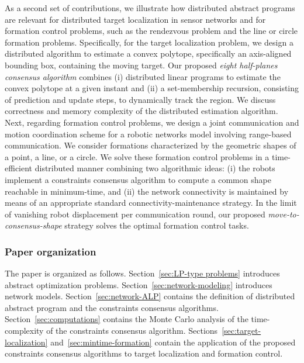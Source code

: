 \documentclass[onecolumn,journal,letterpaper]{IEEEtran}
\begin{document}
As a second set of contributions, we illustrate how distributed abstract
programs are relevant for distributed target localization in sensor
networks and for formation control problems, such as the rendezvous problem
and the line or circle formation problems. Specifically, for the target
localization problem, we design a distributed algorithm to estimate a
convex polytope, specifically an axis-aligned bounding box, containing the
moving target.  Our proposed \emph{eight half-planes consensus algorithm}
combines (i) distributed linear programs to estimate the convex polytope at
a given instant and (ii) a set-membership recursion, consisting of
prediction and update steps, to dynamically track the region. We discuss
correctness and memory complexity of the distributed estimation algorithm.
Next, regarding formation control problems, we design a joint communication
and motion coordination scheme for a robotic networks model involving
range-based communication.  We consider formations characterized by the
geometric shapes of a point, a line, or a circle.  We solve these formation
control problems in a time-efficient distributed manner combining two
algorithmic ideas: (i) the robots implement a constraints consensus
algorithm to compute a common shape reachable in minimum-time, and (ii) the
network connectivity is maintained by means of an appropriate standard
connectivity-maintenance strategy. In the limit of vanishing robot displacement per communication round, our
proposed \emph{move-to-consensus-shape} strategy solves the optimal
formation control tasks.


\subsubsection*{Paper organization}
The paper is organized as follows.  Section~\ref{sec:LP-type problems}
introduces abstract optimization problems.
Section~\ref{sec:network-modeling} introduces network models.
Section~\ref{sec:network-ALP} contains the definition of distributed
abstract program and the constraints consensus
algorithms. Section~\ref{sec:computations} contains the Monte Carlo
analysis of the time-complexity of the constraints consensus
algorithm. Sections~\ref{sec:target-localization}
and~\ref{sec:mintime-formation} contain the application of the proposed
constraints consensus algorithms to target localization and formation
control.
\end{document}
